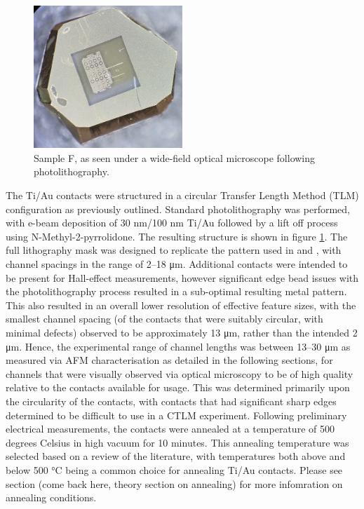 \begin{refsection}
\begin{figure}[h]
    \centering
    \includegraphics[width=0.5\textwidth]{Chapter3/Figs/Raster/Sample F 2022/IMG20220607171511 trim.jpg}
    \caption{Sample F, as seen under a wide-field optical microscope following photolithography.}
    \label{fig:sampleF}
\end{figure}

The Ti/Au contacts were structured in a circular Transfer Length Method (TLM) configuration as previously outlined. Standard photolithography was performed, with e-beam deposition of 30 \si{\nano\metre}/100 \si{\nano\metre} Ti/Au followed by a lift off process using N-Methyl-2-pyrrolidone. The resulting structure is shown in figure \ref{fig:sampleF}. The full lithography mask was designed to replicate the pattern used in \cite{kato2009} and \cite{matsumoto2013}, with channel spacings in the range of 2--18 \si{\micro\metre}. Additional contacts were intended to be present for Hall-effect measurements, however significant edge bead issues with the photolithography process resulted in a sub-optimal resulting metal pattern. This also resulted in an overall lower resolution of effective feature sizes, with the smallest channel spacing (of the contacts that were suitably circular, with minimal defects) observed to be approximately 13 \si{\micro\metre}, rather than the intended 2 \si{\micro\metre}. Hence, the experimental range of channel lengths was between 13--30 \si{\micro\metre} as measured via AFM characterisation as detailed in the following sections, for channels that were visually observed via optical microscopy to be of high quality relative to the contacts available for usage. This was determined primarily upon the circularity of the contacts, with contacts that had significant sharp edges determined to be difficult to use in a CTLM experiment. Following preliminary electrical measurements, the contacts were annealed at a temperature of 500 degrees Celsius in high vacuum for 10 minutes. This annealing temperature was selected based on a review of the literature, with temperatures both above and below 500 \si{\degreeCelsius} being a common choice for annealing Ti/Au contacts. Please see section (come back here, theory section on annealing) for more infomration on annealing conditions. %


\end{refsection}
